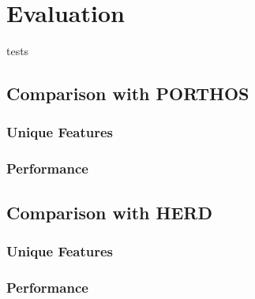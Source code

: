 \chapter{Evaluation}
\label{ch:eval}

tests


\section{Comparison with PORTHOS}

\subsection{Unique Features}
\subsection{Performance}




\section{Comparison with HERD}

\subsection{Unique Features}
\subsection{Performance}

